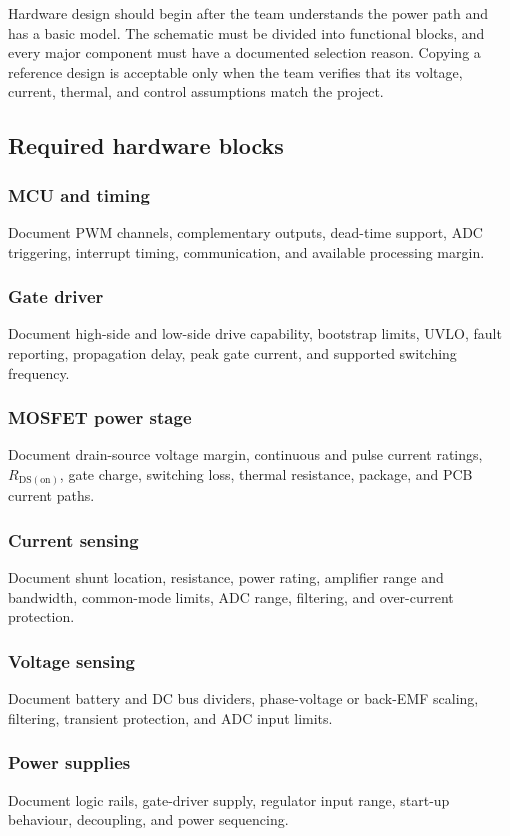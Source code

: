 \documentclass[11pt,a4paper]{article}
\begin{document}
Hardware design should begin after the team understands the power path and
has a basic model. The schematic must be divided into functional blocks, and
every major component must have a documented selection reason. Copying a
reference design is acceptable only when the team verifies that its voltage,
current, thermal, and control assumptions match the project.

\subsection{Required hardware blocks}

\subsubsection{MCU and timing}
Document PWM channels, complementary outputs, dead-time support, ADC
triggering, interrupt timing, communication, and available processing margin.

\subsubsection{Gate driver}
Document high-side and low-side drive capability, bootstrap limits, UVLO,
fault reporting, propagation delay, peak gate current, and supported
switching frequency.

\subsubsection{MOSFET power stage}
Document drain-source voltage margin, continuous and pulse current ratings,
\(R_{\mathrm{DS(on)}}\), gate charge, switching loss, thermal resistance,
package, and PCB current paths.

\subsubsection{Current sensing}
Document shunt location, resistance, power rating, amplifier range and
bandwidth, common-mode limits, ADC range, filtering, and over-current
protection.

\subsubsection{Voltage sensing}
Document battery and DC bus dividers, phase-voltage or back-EMF scaling,
filtering, transient protection, and ADC input limits.

\subsubsection{Power supplies}
Document logic rails, gate-driver supply, regulator input range, start-up
behaviour, decoupling, and power sequencing.
\end{document}
